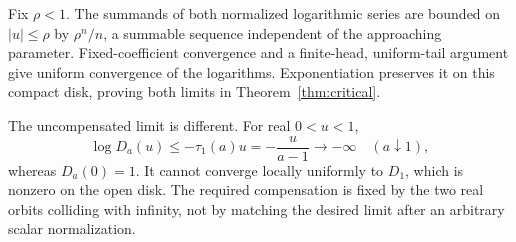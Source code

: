 Fix $\rho<1$. The summands of both normalized logarithmic series are bounded
on $|u|\le\rho$ by $\rho^n/n$, a summable sequence independent of the
approaching parameter. Fixed-coefficient convergence and a finite-head,
uniform-tail argument give uniform convergence of the logarithms.
Exponentiation preserves it on this compact disk, proving both limits in
Theorem~\ref{thm:critical}.

The uncompensated limit is different. For real $0<u<1$,
\begin{equation}\label{eq:unreduced}
 \log D_a(u)\le-\tau_1(a)u=-\frac u{a-1}\longrightarrow-\infty
 \quad(a\downarrow1),
\end{equation}
whereas $D_a(0)=1$. It cannot converge locally uniformly to $D_1$, which is
nonzero on the open disk. The required compensation is fixed by the two
real orbits colliding with infinity, not by matching the desired limit after
an arbitrary scalar normalization.
